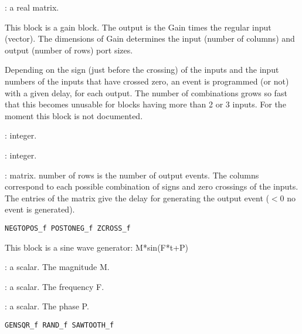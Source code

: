 \label{GAINf}

\begin{scitem}
\item[{\verb?Gain?}]
: a real matrix. 
\end{scitem}%
This block is a gain block. The output is the Gain times the
regular input (vector). The dimensions of Gain determines the
input (number of columns) and output (number of rows) port sizes.





%
%


\label{GENERALf}

Depending on the sign (just before the crossing) of the inputs and
the input numbers of the inputs that have crossed zero, an event is
programmed (or not) with a given delay, for each output. The number
of combinations grows so fast that this becomes unusable for blocks
having more than 2 or 3 inputs. For the moment this block is not
documented.
\begin{scitem}
\item[{\verb?Size of regular input?}]
: integer.
\item[{\verb?Number of output events?}]
: integer.
\item[{\verb?the routing matrix?}]
: matrix. number of rows is the number of output events. The columns
correspond to each possible combination of signs and zero crossings
of the inputs. The entries of the matrix give the delay for generating
the output event ($<$0 no event is generated).
\end{scitem}%
{\verb?NEGTOPOS_f POSTONEG_f ZCROSS_f ?} \pageref{NEGTOPOSfPOSTONEGfZCROSSf}





%
%


\label{GENSINf}

This block is a sine wave generator: M*sin(F*t+P)
\begin{scitem}
\item[{\verb?Magnitude?}]
: a scalar. The magnitude M.
\item[{\verb?Frequency?}]
: a scalar. The frequency F.
\item[{\verb?Phase?}]
: a scalar. The phase P.
\end{scitem}%
{\verb?GENSQR_f RAND_f SAWTOOTH_f?} \pageref{GENSQRfRANDfSAWTOOTHf}






